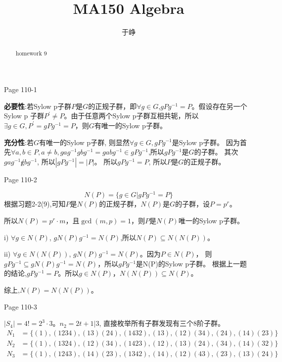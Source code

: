 \documentclass{ximera}
\title{MA150 Algebra}
\author{于峥}
\begin{document}
\begin{abstract}
    homework 9
\end{abstract}

\maketitle

\begin{problem} Page 110-1
    \begin{solution}
        \textbf{必要性}:若Sylow p子群$P$是$G$的正规子群，即$\forall g \in G$,$gPg^{-1}=P$。假设存在另一个Sylow p 
        子群$P^{'} \not=P$。由于任意两个Sylow p子群互相共轭，所以$\exists g \in G, P^{'}=gPg^{-1}=P$，则$G$有唯一的Sylow p子群。

        \textbf{充分性}:若$G$有唯一的Sylow p子群, 则显然$\forall g \in G,gPg^{-1}$是Sylow p子群。
        因为首先$\forall a, b \in P, a\not=b,gag^{-1}gbg^{-1}=gabg^{-1}\in gPg^{-1}$,所以$gPg^{-1}$是$G$的子群。
        其次$gag^{-1} \not gbg^{-1}$, 所以$|gPg^{-1}|=|P|$。
        所以$gPg^{-1}=P$, 所以$P$是$G$的正规子群。
    \end{solution}
\end{problem}

\begin{problem} Page 110-2
    \begin{solution}
        $$
            N(P) = \{g \in G | gPg^{-1} = P \}
        $$
        根据习题2-2(9),可知$P$是$N(P)$的正规子群，$N(P)$是$G$的子群，设$P=p^{r}$。

        所以$N(P)=p^r\cdot m$，且$\gcd(m,p)=1$，则$P$是$N(P)$唯一的Sylow p子群。

        i) $\forall g \in N(P)$, $gN(P)g^{-1}=N(P)$,所以$N(P) \subseteq N(N(P))$。
        
        ii) $\forall g \in N(N(P))$, $gN(P)g^{-1}=N(P)$。因为$P\in N(P)$，
        则$gPg^{-1} \subseteq gN(P)g^{-1} = N(P)$，所以$gPg^{-1}$是N(P)的Sylow p子群。
        根据上一题的结论,$gPg^{-1}=P$。所以$g\in N(P)$，$N(N(P)) \subseteq N(P)$。

        综上,$N(P)=N(N(P))$。
    \end{solution}
\end{problem}

\begin{problem} Page 110-3
    \begin{solution}
        $|S_4|=4!=2^3\cdot 3$。$n_2 = 2t+1| 3$, 直接枚举所有子群发现有三个8阶子群。
        $$
        \begin{aligned}
            N_1&=\{(1),(1234),(13)(24),(1432),(13),(12)(34),(24),(14)(23) \} \\
            N_2&=\{(1),(1324),(12)(34),(1423),(12),(13)(24),(34),(14)(32) \} \\  
            N_3&=\{(1),(1243),(14)(23),(1342),(14),(12)(43),(23),(13)(24) \}
        \end{aligned}
        $$
    \end{solution}
\end{problem}
\end{document}
